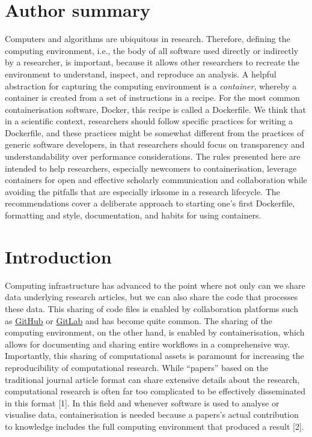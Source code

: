 \documentclass[10pt,letterpaper]{article}
\begin{document}
\section*{Author summary}
Computers and algorithms are ubiquitous in research. Therefore, defining
the computing environment, i.e., the body of all software used directly
or indirectly by a researcher, is important, because it allows other
researchers to recreate the environment to understand, inspect, and
reproduce an analysis. A helpful abstraction for capturing the computing
environment is a \emph{container}, whereby a container is created from a
set of instructions in a recipe. For the most common containerisation
software, Docker, this recipe is called a Dockerfile. We think that in a
scientific context, researchers should follow specific practices for
writing a Dockerfile, and these practices might be somewhat different
from the practices of generic software developers, in that researchers
should focus on transparency and understandability over performance
considerations. The rules presented here are intended to help
researchers, especially newcomers to containerisation, leverage
containers for open and effective scholarly communication and
collaboration while avoiding the pitfalls that are especially irksome in
a research lifecycle. The recommendations cover a deliberate approach to
starting one's first Dockerfile, formatting and style, documentation,
and habits for using containers.

\linenumbers

\hypertarget{introduction}{%
\section*{Introduction}\label{introduction}}

Computing infrastructure has advanced to the point where not only can we
share data underlying research articles, but we can also share the code
that processes these data. This sharing of code files is enabled by
collaboration platforms such as \href{https://github.com}{GitHub} or
\href{https://gitlab.com}{GitLab} and has become quite common. The
sharing of the computing environment, on the other hand, is enabled by
containerisation, which allows for documenting and sharing entire
workflows in a comprehensive way. Importantly, this sharing of
computational assets is paramount for increasing the reproducibility of
computational research. While ``papers'' based on the traditional
journal article format can share extensive details about the research,
computational research is often far too complicated to be effectively
disseminated in this format {[}1{]}. In this field and whenever software
is used to analyse or visualise data, containerisation is needed because
a papers's actual contribution to knowledge includes the full computing
environment that produced a result {[}2{]}.
\end{document}

